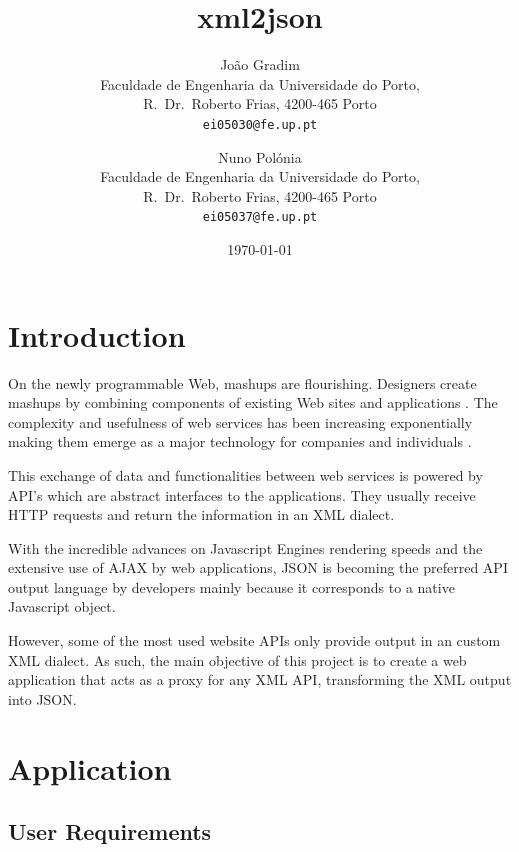 \documentclass[twocolumn,twoside,10pt,a4paper]{article}
\title{xml2json}
\author{João Gradim\\
\small Faculdade de Engenharia da Universidade do Porto,\\[-0.8ex]
\small R.\ Dr.\ Roberto Frias, 4200-465 Porto\\[-0.8ex]
\small \texttt{ei05030@fe.up.pt}\\
\and
Nuno Polónia\\
\small Faculdade de Engenharia da Universidade do Porto,\\[-0.8ex]
\small R.\ Dr.\ Roberto Frias, 4200-465 Porto\\[-0.8ex]
\small \texttt{ei05037@fe.up.pt}
}
\date{\today}
\begin{document}
\maketitle
\thispagestyle{plain}

\begin{abstract}

\end{abstract}

\section{Introduction}\label{sec:intro}
On the newly programmable Web, mashups are flourishing. Designers create mashups by combining components of existing Web sites and applications \cite{maximilien}. The complexity and usefulness of web services has been increasing exponentially making them emerge as a major technology for companies and individuals \cite{benslimane}.

This exchange of data and functionalities between web services is powered by API's which are abstract interfaces to the applications. They usually receive HTTP requests and return the information in an XML dialect.

With the incredible advances on Javascript Engines rendering speeds and the extensive use of AJAX by web applications, JSON is becoming the preferred API output language by developers mainly because it corresponds to a native Javascript object.

However, some of the most used website APIs only provide output in an custom XML dialect. As such, the main objective of this project is to create a web application that acts as a proxy for any XML API, transforming the XML output into JSON.

\section{Application}\label{sec:application}


\subsection{User Requirements}\label{sec:user-requirements}
\end{document}
